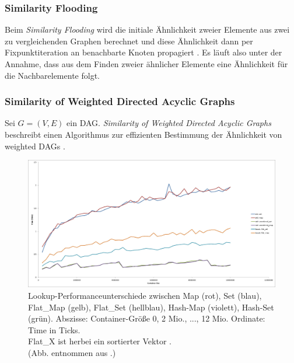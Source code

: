 \subsubsection{Similarity Flooding} \label{sec:sim_flooding}

Beim \textit{Similarity Flooding} wird die initiale Ähnlichkeit zweier Elemente aus zwei zu vergleichenden Graphen berechnet und diese Ähnlichkeit dann per Fixpunktiteration an benachbarte Knoten propagiert \cite{S.Melnik.2002}. Es läuft also unter der Annahme, dass aus dem Finden zweier ähnlicher Elemente eine Ähnlichkeit für die Nachbarelemente folgt. 

\subsubsection{Similarity of Weighted Directed Acyclic Graphs} \label{sec:sim_dag}

Sei $G = (V, E)$ ein \ac{DAG}. \textit{Similarity of Weighted Directed Acyclic Graphs} beschreibt einen Algorithmus zur effizienten Bestimmung der Ähnlichkeit von weighted \acp{DAG} \cite{Jin.2004}.
 
\begin{figure}
	\centering
	\includegraphics[width=\textwidth]{Bilder/GCC_timings_10M.jpg} 
	\caption{Lookup-Performanceunterschiede zwischen Map (rot), Set (blau), Flat\_Map (gelb), Flat\_Set (hellblau), Hash-Map (violett), Hash-Set (grün). Abszisse: Container-Größe 0, 2 Mio., ..., 12 Mio. Ordinate: Time in Ticks.\\ Flat\_X ist herbei ein sortierter Vektor \cite{.20220811}.\\ (Abb. entnommen aus \cite{.20220819b}.)}
	\label{fig:container_perf}
\end{figure} 
